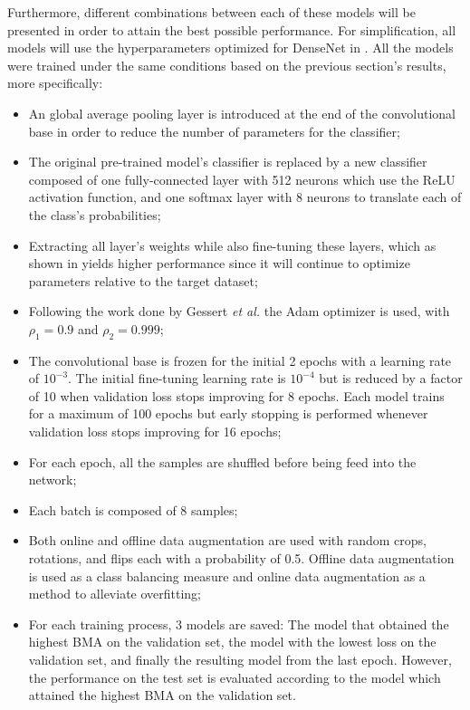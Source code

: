    Furthermore, different combinations between each of these models will be presented in order to attain the best possible performance. For simplification, all models will use the hyperparameters optimized for DenseNet in . All the models were trained under the same conditions based on the previous section's results, more specifically:
    \begin{itemize}
        \item An global average pooling layer is introduced at the end of the convolutional base in order to reduce the number of parameters for the classifier;
        \item The original pre-trained model's classifier is replaced by a new classifier composed of one fully-connected layer with 512 neurons which use the ReLU activation function, and one softmax layer with 8 neurons to translate each of the class's probabilities;
        \item Extracting all layer's weights while also fine-tuning these layers, which as shown in  yields higher performance since it will continue to optimize parameters relative to the target dataset;
        \item Following the work done by Gessert \textit{et al.} \cite{gessert2018} the Adam optimizer \cite{adam} is used, with $\rho_{1} = 0.9$ and $\rho_{2}=0.999$;
        \item The convolutional base is frozen for the initial 2 epochs with a learning rate of $10^{-3}$. The initial fine-tuning learning rate is $10^{-4}$ but is reduced by a factor of 10 when validation loss stops improving for 8 epochs. Each model trains for a maximum of 100 epochs but early stopping is performed whenever validation loss stops improving for 16 epochs;
        \item For each epoch, all the samples are shuffled before being feed into the network;
        \item Each batch is composed of 8 samples;
        \item Both online and offline data augmentation are used with random crops, rotations, and flips each with a probability of 0.5. Offline data augmentation is used as a class balancing measure and online data augmentation as a method to alleviate overfitting;
        \item For each training process, 3 models are saved: The model that obtained the highest \ac{BMA} on the validation set, the model with the lowest loss on the validation set, and finally the resulting model from the last epoch. However, the performance on the test set is evaluated according to the model which attained the highest \ac{BMA} on the validation set.
    \end{itemize}
    
